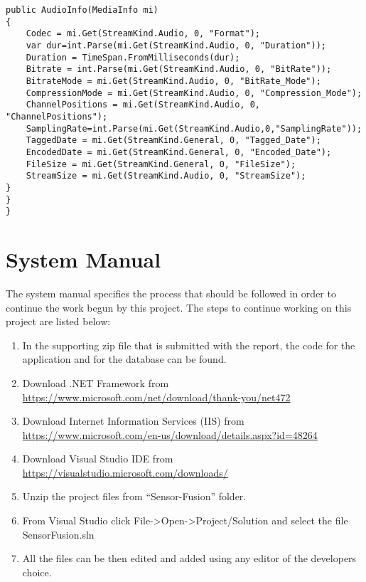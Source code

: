 \begin{lstlisting}
public AudioInfo(MediaInfo mi)
{
	Codec = mi.Get(StreamKind.Audio, 0, "Format");
	var dur=int.Parse(mi.Get(StreamKind.Audio, 0, "Duration"));
	Duration = TimeSpan.FromMilliseconds(dur);
	Bitrate = int.Parse(mi.Get(StreamKind.Audio, 0, "BitRate"));
	BitrateMode = mi.Get(StreamKind.Audio, 0, "BitRate_Mode");
	CompressionMode = mi.Get(StreamKind.Audio, 0, "Compression_Mode");
	ChannelPositions = mi.Get(StreamKind.Audio, 0, "ChannelPositions");
	SamplingRate=int.Parse(mi.Get(StreamKind.Audio,0,"SamplingRate"));
	TaggedDate = mi.Get(StreamKind.General, 0, "Tagged_Date");
	EncodedDate = mi.Get(StreamKind.General, 0, "Encoded_Date");
	FileSize = mi.Get(StreamKind.General, 0, "FileSize");
	StreamSize = mi.Get(StreamKind.Audio, 0, "StreamSize");
}
}
}
\end{lstlisting}


\chapter{System Manual}
\label{app:system_manual}

The system manual specifies the process that should be followed in order to continue the work begun by this project. The steps to continue working on this project are listed below:

\begin{enumerate} 
\item In the supporting zip file that is submitted with the report, the code for the application and for the database can be found.
\item Download .NET Framework from \url{https://www.microsoft.com/net/download/thank-you/net472}
\item  Download Internet Information Services (IIS) from \url{https://www.microsoft.com/en-us/download/details.aspx?id=48264}
\item Download Visual Studio IDE from \url{https://visualstudio.microsoft.com/downloads/}
\item Unzip the project files from ``Sensor-Fusion'' folder.
\item From Visual Studio click File->Open->Project/Solution and select the file SensorFusion.sln
\item All the files can be then edited and added using any editor of the developers choice.

  
\end{enumerate}

